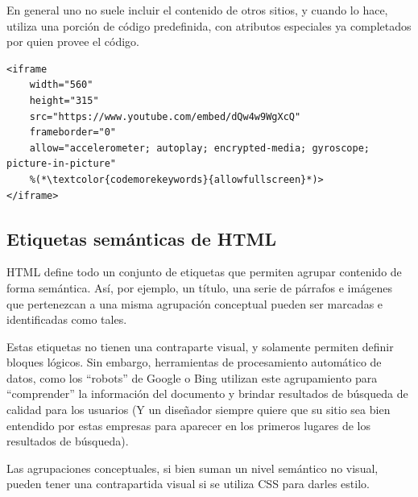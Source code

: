 En general uno no suele incluir el contenido de otros sitios, y cuando lo hace,
utiliza una porción de código predefinida, con atributos especiales ya completados
por quien provee el código.

\begin{lstlisting}[language=XHTML]
<iframe
    width="560"
    height="315"
    src="https://www.youtube.com/embed/dQw4w9WgXcQ"
    frameborder="0"
    allow="accelerometer; autoplay; encrypted-media; gyroscope; picture-in-picture"
    %(*\textcolor{codemorekeywords}{allowfullscreen}*)>
</iframe>
\end{lstlisting}

\subsection*{Etiquetas semánticas de HTML}

HTML define todo un conjunto de etiquetas que permiten agrupar contenido de forma
semántica. Así, por ejemplo, un título, una serie de párrafos e imágenes que pertenezcan
a una misma agrupación conceptual pueden ser marcadas e identificadas como tales.

Estas etiquetas no tienen una contraparte visual, y solamente permiten definir
bloques lógicos. Sin embargo, herramientas de procesamiento automático de datos,
como los ``robots'' de Google o Bing utilizan este agrupamiento para ``comprender''
la información del documento y brindar resultados de búsqueda de calidad para los
usuarios (Y un diseñador siempre quiere que su sitio sea bien entendido por estas
empresas para aparecer en los primeros lugares de los resultados de búsqueda).

Las agrupaciones conceptuales, si bien suman un nivel semántico no visual, pueden
tener una contrapartida visual si se utiliza CSS para darles estilo.

